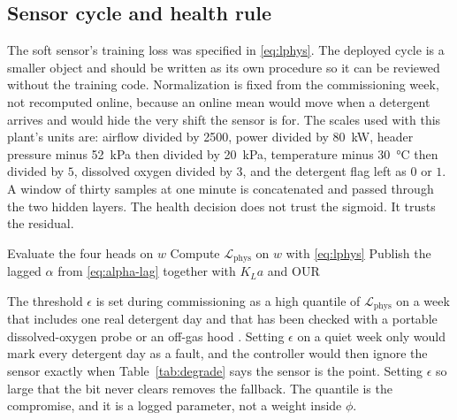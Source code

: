 \subsection{Sensor cycle and health rule}

The soft sensor's training loss was specified in \eqref{eq:lphys}. The deployed cycle is a smaller object and should be written as its own procedure so it can be reviewed without the training code. Normalization is fixed from the commissioning week, not recomputed online, because an online mean would move when a detergent arrives and would hide the very shift the sensor is for. The scales used with this plant's units are: airflow divided by \SI{2500}{\nmcph}, power divided by \SI{80}{\kilo\watt}, header pressure minus \SI{52}{\kilo\pascal} then divided by \SI{20}{\kilo\pascal}, temperature minus \SI{30}{\celsius} then divided by $5$, dissolved oxygen divided by $3$, and the detergent flag left as $0$ or $1$. A window of thirty samples at one minute is concatenated and passed through the two hidden layers. The health decision does not trust the sigmoid. It trusts the residual.

\begin{algorithm}[ht]
\caption{One-minute sensor publish}
\label{alg:sensor}
Evaluate the four heads on $w$\;
Compute $\mathcal{L}_{\mathrm{phys}}$ on $w$ with \eqref{eq:lphys}\;
Publish the lagged $\alpha$ from \eqref{eq:alpha-lag} together with $K_La$ and $\mathrm{OUR}$\;
\end{algorithm}

The threshold $\epsilon$ is set during commissioning as a high quantile of $\mathcal{L}_{\mathrm{phys}}$ on a week that includes one real detergent day and that has been checked with a portable dissolved-oxygen probe or an off-gas hood \cite{leu2009,redmon1983,asce2007oxygen}. Setting $\epsilon$ on a quiet week only would mark every detergent day as a fault, and the controller would then ignore the sensor exactly when Table~\ref{tab:degrade} says the sensor is the point. Setting $\epsilon$ so large that the bit never clears removes the fallback. The quantile is the compromise, and it is a logged parameter, not a weight inside $\phi$.

